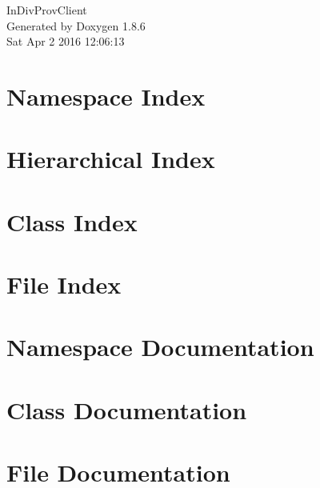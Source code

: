 \documentclass[twoside]{book}
\newcommand{\clearemptydoublepage}{%
  \newpage{\pagestyle{empty}\cleardoublepage}%
}
\begin{document}
\hypersetup{pageanchor=false}
\begin{titlepage}
\vspace*{7cm}
\begin{center}%
{\Large In\-Div\-Prov\-Client }\\
\vspace*{1cm}
{\large Generated by Doxygen 1.8.6}\\
\vspace*{0.5cm}
{\small Sat Apr 2 2016 12:06:13}\\
\end{center}
\end{titlepage}
\clearemptydoublepage
\tableofcontents
\clearemptydoublepage
{}
\hypersetup{pageanchor=true}

\chapter{Namespace Index}

\chapter{Hierarchical Index}

\chapter{Class Index}

\chapter{File Index}

\chapter{Namespace Documentation}

\chapter{Class Documentation}
















\chapter{File Documentation}










\newpage
{}
{}
\printindex
\end{document}
